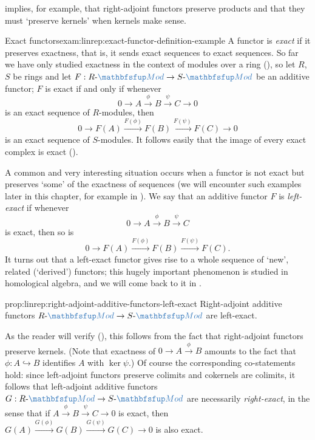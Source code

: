  implies, for example,
that right-adjoint functors
preserve products and that they must `preserve kernels' when kernels
make sense.
\begin{exam}{Exact functors}{exam:linrep:exact-functor-definition-example}
  A functor is \emph{exact} if it preserves exactness, that is, it
  sends exact sequences to exact sequences. So far we have only
  studied exactness in the context of modules over a ring
  (), so let $R$,
  $S$ be rings and let
  $F : R\text{-}\categ{Mod} \to S\text{-}\categ{Mod}$ be an additive
  functor; $F$ is exact if and only if whenever
  \[
    0 \to A \xrightarrow{\phi} B \xrightarrow{\psi} C \to 0
  \]
  is an exact sequence of $R$-modules, then
  \[
    0 \to F(A) \xrightarrow{F(\phi)} F(B) \xrightarrow{F(\psi)} F(C)
    \to 0
  \]
  is an exact sequence of $S$-modules. It follows easily that the
  image of every exact complex is exact
  ().

  A common and very interesting situation occurs when a functor is not
  exact but preserves `some' of the exactness of sequences (we will
  encounter such examples later in this chapter, for example in
  ). We
  say that an additive functor $F$ is \emph{left-exact} if whenever
  \[
    0 \to A \xrightarrow{\phi} B \xrightarrow{\psi} C
  \]
  is exact, then so is
  \[
    0 \to F(A) \xrightarrow{F(\phi)} F(B) \xrightarrow{F(\psi)} F(C).
  \]
  It turns out that a left-exact functor gives rise to a whole
  sequence of `new', related (`derived') functors; this hugely
  important phenomenon is studied in homological algebra, and we will
  come back to it in .
\end{exam}
\begin{prop}{}{prop:linrep:right-adjoint-additive-functors-left-exact}
  Right-adjoint additive functors
  $R\text{-}\categ{Mod} \to S\text{-}\categ{Mod}$ are left-exact.
\end{prop}
As the reader will verify
(),
this follows from the fact that right-adjoint functors preserve
kernels. (Note that exactness of $0 \to A \xrightarrow{\phi} B$
amounts to the fact that $\phi : A \hookrightarrow B$ identifies $A$
with $\ker \psi$.) Of course the corresponding co-statements hold:
since left-adjoint functors preserve colimits and cokernels are
colimits, it follows that left-adjoint additive functors
$G : R\text{-}\categ{Mod} \to S\text{-}\categ{Mod}$ are necessarily
\emph{right-exact}, in the sense that if
$A \xrightarrow{\phi} B \xrightarrow{\psi} C \to 0$ is exact, then
$G(A) \xrightarrow{G(\phi)} G(B) \xrightarrow{G(\psi)} G(C) \to 0$ is
also exact.

